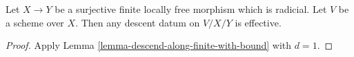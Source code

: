 \begin{lemma}
\label{lemma-descend-along-finite-radicial}
Let $X \to Y$ be a surjective finite locally free morphism which is radicial. 
Let $V$ be a scheme over $X$. Then any descent datum on $V/X/Y$ is effective.
\end{lemma}

\begin{proof}
Apply Lemma \ref{lemma-descend-along-finite-with-bound} with $d = 1$.
\end{proof}














